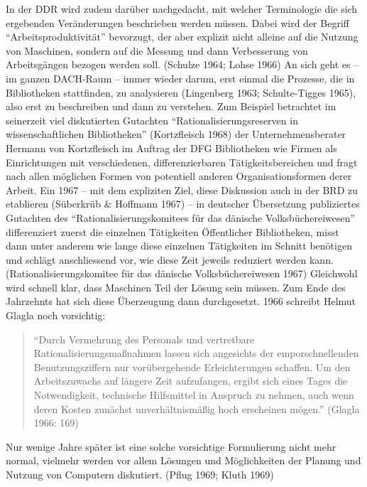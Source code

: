 \documentclass[a4paper,
fontsize=11pt,
oneside,
numbers=noperiodatend,
parskip=half-,
bibliography=totoc,
final
]{scrartcl}
\begin{document}
In der DDR wird zudem darüber nachgedacht, mit welcher Terminologie die
sich ergebenden Veränderungen beschrieben werden müssen. Dabei wird der
Begriff \enquote{Arbeitsproduktivität} bevorzugt, der aber explizit nicht
alleine auf die Nutzung von Maschinen, sondern auf die Messung und dann
Verbesserung von Arbeitsgängen bezogen werden soll. (Schulze 1964; Lohse
1966) An sich geht es -- im ganzen DACH-Raum -- immer wieder darum, erst
einmal die Prozesse, die in Bibliotheken stattfinden, zu analysieren
(Lingenberg 1963; Schulte-Tigges 1965), also erst zu beschreiben und
dann zu verstehen. Zum Beispiel betrachtet im seinerzeit viel
diskutierten Gutachten \enquote{Rationalisierungsreserven in wissenschaftlichen
Bibliotheken} (Kortzfleisch 1968) der Unternehmensberater Hermann von
Kortzfleisch im Auftrag der DFG Bibliotheken wie Firmen als
Einrichtungen mit verschiedenen, differenzierbaren Tätigkeitsbereichen
und fragt nach allen möglichen Formen von potentiell anderen
Organisationsformen derer Arbeit. Ein 1967 -- mit dem expliziten Ziel,
diese Diskussion auch in der BRD zu etablieren (Süberkrüb \& Hoffmann
1967) -- in deutscher Übersetzung publiziertes Gutachten des
\enquote{Rationalisierungskomitees für das dänische Volksbüchereiwesen}
differenziert zuerst die einzelnen Tätigkeiten Öffentlicher
Bibliotheken, misst dann unter anderem wie lange diese einzelnen
Tätigkeiten im Schnitt benötigen und schlägt anschliessend vor, wie
diese Zeit jeweils reduziert werden kann. (Rationalisierungskomitee für
das dänische Volksbüchereiwesen 1967) Gleichwohl wird schnell klar, dass
Maschinen Teil der Lösung sein müssen. Zum Ende des Jahrzehnts hat sich
diese Überzeugung dann durchgesetzt. 1966 schreibt Helmut Glagla noch
vorsichtig:

\begin{quote}
\enquote{Durch Vermehrung des Personals und vertretbare
Rationalisierungsmaßnahmen lassen sich angesichts der emporschnellenden
Benutzungsziffern nur vorübergehende Erleichterungen schaffen. Um den
Arbeitszuwachs auf längere Zeit aufzufangen, ergibt sich eines Tages die
Notwendigkeit, technische Hilfsmittel in Anspruch zu nehmen, auch wenn
deren Kosten zunächst unverhältnismäßig hoch erscheinen mögen.} (Glagla
1966: 169)
\end{quote}

Nur wenige Jahre später ist eine solche vorsichtige Formulierung nicht
mehr normal, vielmehr werden vor allem Lösungen und Möglichkeiten der
Planung und Nutzung von Computern diskutiert. (Pflug 1969; Kluth 1969)
\end{document}
